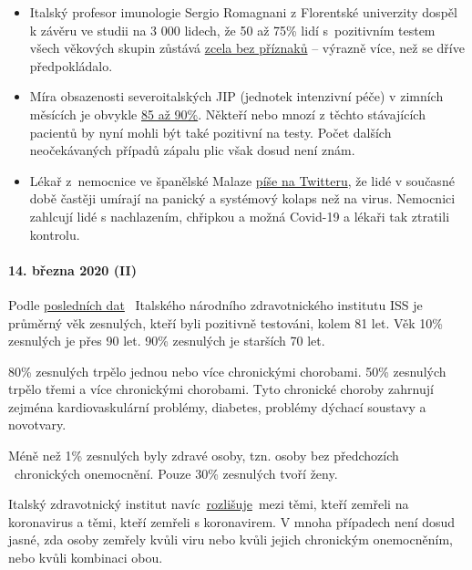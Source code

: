 \begin{itemize}
\tightlist
\item
  Italský profesor imunologie Sergio Romagnani z Florentské univerzity
  dospěl k závěru ve studii na 3 000 lidech, že 50 až 75\% lidí
  s~pozitivním testem všech věkových skupin zůstává
  \href{https://www.repubblica.it/salute/medicina-e-ricerca/2020/03/16/news/coronavirus_studio_il_50-75_dei_casi_a_vo_sono_asintomatici_e_molto_contagiosi-251474302/}{zcela
  bez příznaků} -- výrazně více, než se dříve předpokládalo.
\item
  Míra obsazenosti severoitalských JIP (jednotek intenzivní péče) v
  zimních měsících je obvykle
  \href{https://jamanetwork.com/journals/jama/fullarticle/2763188}{85 až
  90\%}. Někteří nebo mnozí z těchto stávajících pacientů by nyní mohli
  být také pozitivní na testy. Počet dalších neočekávaných případů
  zápalu plic však dosud není znám.
\item
  Lékař z~nemocnice ve španělské Malaze
  \href{https://twitter.com/NeurologaenSAS/status/1239498772570308609}{píše
  na Twitteru}, že lidé v současné době častěji umírají na panický a
  systémový kolaps než na virus. Nemocnici zahlcují lidé s nachlazením,
  chřipkou a možná Covid-19 a lékaři tak ztratili kontrolu.
\end{itemize}

\hypertarget{14-bux159ezna-2020-ii}{%
\paragraph{14. března 2020 (II)}\label{14-bux159ezna-2020-ii}}

Podle
\href{https://www.epicentro.iss.it/coronavirus/sars-cov-2-decessi-italia}{posledních
dat} ~Italského národního zdravotnického institutu ISS je průměrný věk
zesnulých, kteří byli pozitivně testováni, kolem 81 let. Věk 10\%
zesnulých je přes 90 let. 90\% zesnulých je starších 70 let.

80\% zesnulých trpělo jednou nebo více chronickými chorobami. 50\%
zesnulých trpělo třemi a více chronickými chorobami. Tyto chronické
choroby zahrnují zejména kardiovaskulární problémy, diabetes, problémy
dýchací soustavy a novotvary.

Méně než 1\% zesnulých byly zdravé osoby, tzn. osoby bez předchozích
~chronických onemocnění. Pouze 30\% zesnulých tvoří ženy.

Italský zdravotnický institut
navíc~\href{https://youtu.be/0M4kbPDHGR0?t=210}{rozlišuje}~mezi těmi,
kteří zemřeli na koronavirus a těmi, kteří zemřeli s koronavirem. V
mnoha případech není dosud jasné, zda osoby zemřely kvůli viru nebo
kvůli jejich chronickým onemocněním, nebo kvůli kombinaci obou.

